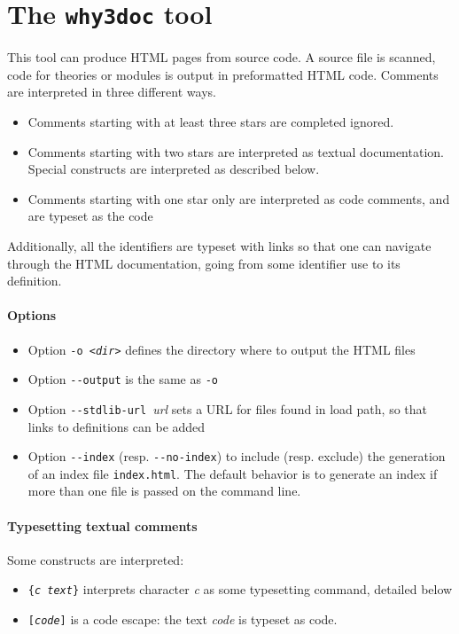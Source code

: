 \section{The \texttt{why3doc} tool}
\label{sec:why3doc}

This tool can produce HTML pages from \why source code. A source file
is scanned, \why code for theories or modules is output in
preformatted HTML code. Comments are interpreted in three different ways.
\begin{itemize}
\item Comments starting with at least three stars are completed
  ignored.
\item Comments starting with two stars are interpreted as textual
  documentation. Special constructs are interpreted as described
  below.
\item Comments starting with one star only are interpreted as code
  comments, and are typeset as the code
\end{itemize}

Additionally, all the \why identifiers are typeset with links so that
one can navigate through the HTML documentation, going from some
identifier use to its definition.

\paragraph{Options}

\begin{itemize}
\item Option \texttt{-o \textsl{<dir>}} defines the directory where to
  output the HTML files
\item Option \verb|--output| is the same as \verb|-o|
\item Option \verb|--stdlib-url|~\textsl{url} sets a URL for files
  found in load path, so that links to definitions can be added
\item Option \verb|--index| (resp. \verb|--no-index|) to include
  (resp. exclude) the generation of an index file \texttt{index.html}.
  The default behavior is to generate an index if more than one file
  is passed on the command line.
\end{itemize}

\paragraph{Typesetting textual comments}

Some constructs are interpreted:
\begin{itemize}
\item \texttt{\{\textsl{c text}\}} interprets character \textsl{c} as
  some typesetting command, detailed below
\item \texttt{[\textsl{code}]} is a code escape: the text
  \textsl{code} is typeset as \why code.
\end{itemize}

